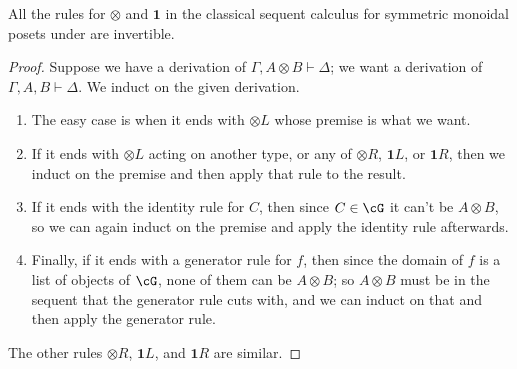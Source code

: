 \documentclass{book}
\let\types\vdash
\def\one{\mathbf{1}}
\let\tensor\otimes
\def\tensorL{\mathord{\tensor}L}
\def\tensorR{\mathord{\tensor}R}
\begin{document}
\begin{thm}\label{thm:seqcalc-smpos-invertible}
  All the rules for $\tensor$ and $\one$ in the classical sequent calculus for symmetric monoidal posets under \cG are invertible.
\end{thm}
\begin{proof}
  Suppose we have a derivation of $\Gamma,A\tensor B\types \Delta$; we want a derivation of $\Gamma,A,B\types \Delta$.
  We induct on the given derivation.
  \begin{enumerate}
  \item The easy case is when it ends with $\tensorL$ whose premise is what we want.
  \item If it ends with $\tensorL$ acting on another type, or any of $\tensorR$, $\one L$, or $\one R$, then we induct on the premise and then apply that rule to the result.
  \item If it ends with the identity rule for $C$, then since $C\in \cG$ it can't be $A\tensor B$, so we can again induct on the premise and apply the identity rule afterwards.
  \item Finally, if it ends with a generator rule for $f$, then since the domain of $f$ is a list of objects of $\cG$, none of them can be $A\tensor B$; so $A\tensor B$ must be in the sequent that the generator rule cuts with, and we can induct on that and then apply the generator rule.
  \end{enumerate}
  The other rules $\tensorR$, $\one L$, and $\one R$ are similar.
\end{proof}
\end{document}
